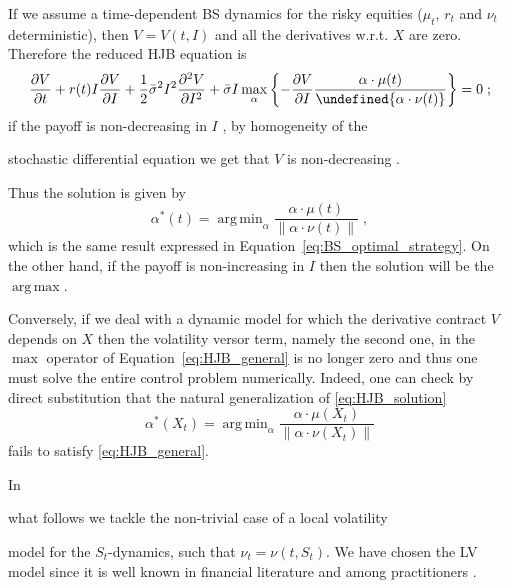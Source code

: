 \documentclass[runningheads]{m2ef}
\DeclareMathOperator*{\argmax}{arg\,max}
\DeclareMathOperator*{\argmin}{arg\,min}
\let\norm\undefined %
\DeclarePairedDelimiter\norm{\lVert}{\rVert}
\newcommand\soutpars[1]{\let\helpcmd\sout\parhelp#1\par\relax\relax}
\newcommand{\change}[1]{{\color{red} {#1}}}%
\newcommand{\remove}[1]{{\color{red} \soutpars{{#1}}}}%
\newcommand{\changeB}[1]{{\color{blue} {#1}}}%
\newcommand{\removeB}[1]{{\color{blue} \soutpars{{#1}}}}%
\begin{document}
If we assume a time-dependent BS dynamics for the risky equities ($\mu_t$, $r_t$ and $\nu_t$ deterministic), then $V = V(t,I)$ and all the derivatives w.r.t. $X$ are zero. Therefore the reduced HJB equation is
\begin{equation}
	\frac{\partial V}{\partial t} +  r(t) I \frac{\partial V}{\partial I}  + \frac{1}{2}\bar{\sigma}^2I^2\frac{\partial^2V}{\partial I^2} + \bar{\sigma}I\max_\alpha \left\{ -\frac{\partial V}{\partial I}   \frac{\alpha \cdot \mu(t)}{\norm{\alpha \cdot \nu(t)}}\right\} = 0 \; ;
\end{equation}
if the payoff is non-decreasing in $I$\change{,} by homogeneity of the \remove{SDE} \change{stochastic differential equation} we get that $V$ is non-decreasing\change{.}\remove{; t}\change{T}hus the solution is given by
\begin{equation}\label{eq:HJB_solution}
 \alpha^*(t) = \argmin_\alpha \frac{\alpha \cdot \mu(t)}{\|\alpha \cdot \nu(t)\|} \; ,
\end{equation}
which is the same result expressed in Equation~\eqref{eq:BS_optimal_strategy}. On the other hand, if the payoff is non-increasing in $I$ then the solution will be the $\argmax$.

Conversely, if we deal with a dynamic model for which the derivative contract $V$ depends on $X$ then the volatility versor term, namely the second one, in the $\max$ operator of Equation~\eqref{eq:HJB_general} is no longer zero and thus one must solve the entire control problem numerically. \changeB{Indeed, one can check by direct substitution that the natural generalization of \eqref{eq:HJB_solution}
\begin{equation}
 \alpha^*(X_t) = \argmin_\alpha \frac{\alpha \cdot \mu(X_t)}{\|\alpha \cdot \nu(X_t)\|}
\end{equation}
fails to satisfy \eqref{eq:HJB_general}.}

In \removeB{this work}\changeB{what follows} we tackle the non-trivial case of a local volatility \remove{(LV)} model for the $S_t$-dynamics, such that $\nu_t = \nu(t,S_t)$. We have chosen the LV model since it is well known in financial literature and among practitioners \change{\cite{Gatheral2006}}.
\end{document}

